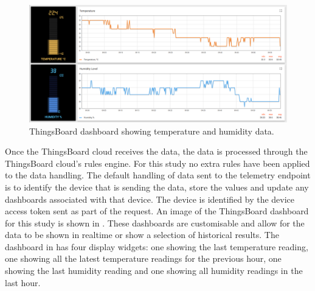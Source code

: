 \begin{figure}[H]
    \centering
    \includegraphics[width=\imageWidth\textwidth]{assets/thingsboard_dashboard.png}
    \caption{\label{fig:thingsboard_dashboard} ThingsBoard dashboard showing temperature and humidity data.}
\end{figure}

Once the ThingsBoard cloud receives the data, the data is processed through the
ThingsBoard cloud's rules engine. For this study no extra rules have been 
applied to the data handling. The default handling of data sent to the telemetry
endpoint is to identify the device that is sending the data, store the values
and update any dashboards associated with that device. The device is 
identified by the device access token sent as part of the request. An image 
of the ThingsBoard dashboard for this study is shown in 
. These dashboards are customisable and allow
for the data to be shown in realtime or show a selection of historical results.
The dashboard in  has four display widgets:
one showing the last temperature reading, one showing all the latest temperature
readings for the previous hour, one showing the last humidity reading and one
showing all humidity readings in the last hour.
